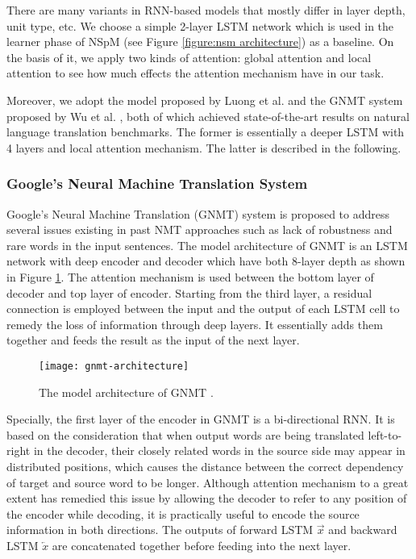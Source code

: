 There are many variants in RNN-based models that mostly differ in layer depth, unit type, etc. We choose a simple 2-layer LSTM network which is used in the learner phase of NSpM \cite{Soru2018a} (see Figure \ref{figure:nsm architecture}) as a baseline. On the basis of it, we apply two kinds of attention: global attention \cite{Bahdanau2014} and local attention \cite{Luong2015} to see how much effects the attention mechanism have in our task.

Moreover, we adopt the model proposed by Luong et al. \cite{Luong2015} and the GNMT system proposed by Wu et al. \cite{Wu2016}, both of which achieved state-of-the-art results on natural language translation benchmarks. The former is essentially a deeper LSTM with 4 layers and local attention mechanism. The latter is described in the following.

\subsubsection*{Google's Neural Machine Translation System}

Google's Neural Machine Translation (GNMT) system \cite{Wu2016} is proposed to address several issues existing in past NMT approaches such as lack of robustness and rare words in the input sentences. The model architecture of GNMT is an LSTM network with deep encoder and decoder which have both 8-layer depth as shown in Figure \ref{figure:gnmt architecture}. The attention mechanism is used between the bottom layer of decoder and top layer of encoder. Starting from the third layer, a residual connection is employed between the input and the output of each LSTM cell to remedy the loss of information through deep layers. It essentially adds them together and feeds the result as the input of the next layer. 

\begin{figure}[h]
\texttt{[image: gnmt-architecture]}
\centering
\caption{The model architecture of GNMT \cite{Wu2016}.}
\label{figure:gnmt architecture}
\end{figure}

Specially, the first layer of the encoder in GNMT is a bi-directional RNN. It is based on the consideration that when output words are being translated left-to-right in the decoder, their closely related words in the source side may appear in distributed positions, which causes the distance between the correct dependency of target and source word to be longer. Although attention mechanism to a great extent has remedied this issue by allowing the decoder to refer to any position of the encoder while decoding, it is practically useful to encode the source information in both directions. The outputs of forward LSTM $ \overrightarrow{x} $ and backward LSTM $ \overleftarrow{x} $ are concatenated together before feeding into the next layer.

